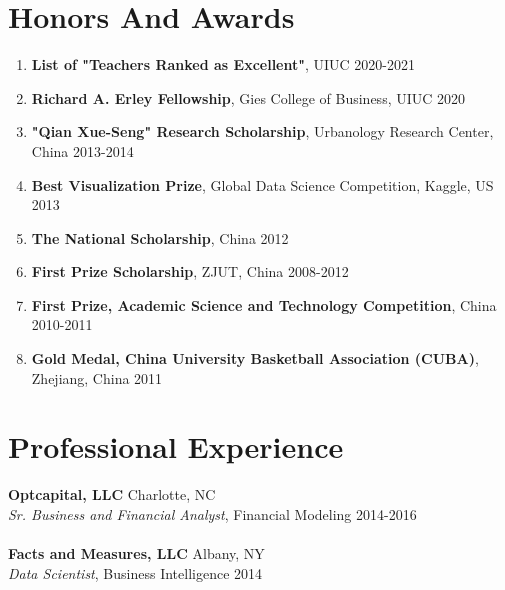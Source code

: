 \documentclass[margin,line]{resume}
\begin{document}
\begin{resume}
 	  \section{\mysidestyle Honors And Awards} 
 	  \begin{enumerate}[topsep=0pt, leftmargin=*]
 	     \item \textbf{List of "Teachers Ranked as Excellent"}, UIUC \hfill 2020-2021
 	     \item \textbf{Richard A. Erley Fellowship}, Gies College of Business, UIUC \hfill 2020
 	     \item \textbf{"Qian Xue-Seng" Research Scholarship}, Urbanology Research Center, China \hfill 2013-2014
 	     \item \textbf{Best Visualization Prize}, Global Data Science Competition, Kaggle, US  \hfill 2013
 	     \item \textbf{The National Scholarship}, China \hfill 2012
 	     \item \textbf{First Prize Scholarship}, ZJUT, China \hfill  2008-2012
 	     \item \textbf{First Prize, Academic Science and Technology Competition}, China \hfill 2010-2011
 	     \item \textbf{Gold Medal, China University Basketball Association (CUBA)}, Zhejiang, China \hfill 2011
 	  \end{enumerate}
    
 	  \section{\mysidestyle Professional Experience} 
         \textbf{Optcapital, LLC} \hfill Charlotte, NC\\
         {\sl Sr. Business and Financial Analyst}, Financial Modeling \hfill 2014-2016\\
         \\
         \textbf{Facts and Measures, LLC} \hfill Albany, NY\\
         {\sl Data Scientist}, Business Intelligence \hfill 2014\\


\end{resume}
\end{document}
